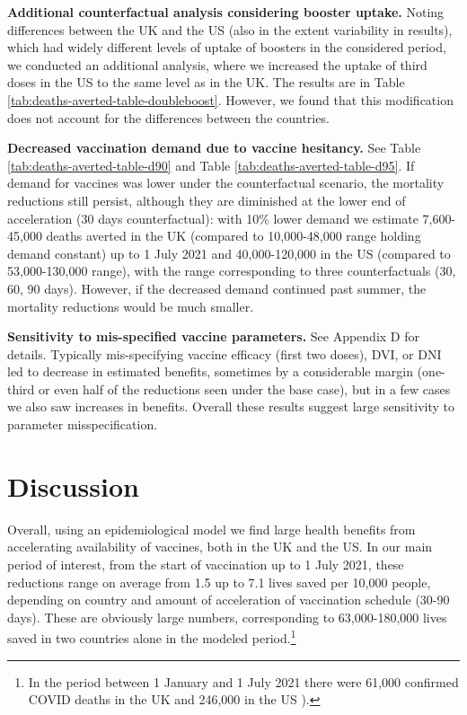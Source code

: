 \documentclass{article}
\begin{document}
\textbf{Additional counterfactual analysis considering booster uptake.} Noting differences between the UK and the US (also in the extent variability in results), which had widely different levels of uptake of boosters in the considered period, we conducted an additional analysis, where we increased the uptake of third doses in the US to the same level as in the UK. The results are in Table \ref{tab:deaths-averted-table-doubleboost}. However, we found that this modification does not account for the differences between the countries.

\textbf{Decreased vaccination demand due to vaccine hesitancy.} See Table \ref{tab:deaths-averted-table-d90} and Table \ref{tab:deaths-averted-table-d95}. If demand for vaccines was lower under the counterfactual scenario, the mortality reductions still persist, although they are diminished at the lower end of acceleration (30 days counterfactual): with 10\% lower demand we estimate 7,600-45,000 deaths averted in the UK (compared to 10,000-48,000 range holding demand constant) up to 1 July 2021 and 40,000-120,000 in the US (compared to 53,000-130,000 range), with the range corresponding to three counterfactuals (30, 60, 90 days). However, if the decreased demand continued past summer, the mortality reductions would be much smaller.

\textbf{Sensitivity to mis-specified vaccine parameters. } See Appendix D for details. Typically mis-specifying vaccine efficacy (first two doses), DVI, or DNI led to decrease in estimated benefits, sometimes by a considerable margin (one-third or even half of the reductions seen under the base case), but in a few cases we also saw increases in benefits. Overall these results suggest large sensitivity to parameter misspecification.

\section{Discussion}\label{discussion}

Overall, using an epidemiological model we find large health benefits from accelerating availability of vaccines, both in the UK and the US. In our main period of interest, from the start of vaccination up to 1 July 2021, these reductions range on average from 1.5 up to 7.1 lives saved per 10,000 people, depending on country and amount of acceleration of vaccination schedule (30-90 days). These are obviously large numbers, corresponding to 63,000-180,000 lives saved in two countries alone in the modeled period.\footnote{In the period between 1 January and 1 July 2021 there were 61,000 confirmed COVID deaths in the UK and 246,000 in the US \citep{Mathieu2021Aglobal}).}
\end{document}
